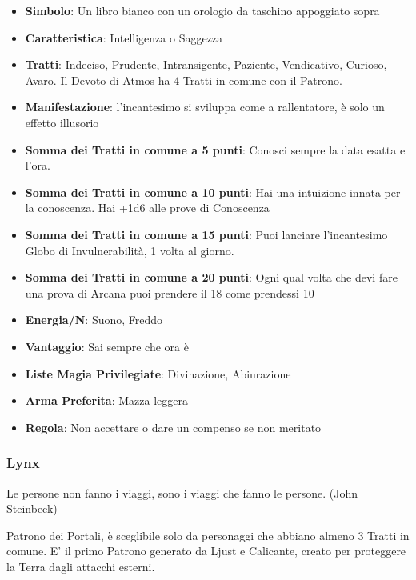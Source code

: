 \begin{multicols}{2}
\begin{itemize}[leftmargin=*] \setlength{\itemsep}{0pt}
\item \textbf{Simbolo}: Un libro bianco con un orologio da taschino appoggiato sopra
\item \textbf{Caratteristica}: Intelligenza o Saggezza
\item \textbf{Tratti}: Indeciso, Prudente, Intransigente, Paziente, Vendicativo, Curioso, Avaro. Il Devoto di Atmos ha 4 Tratti in comune con il Patrono.
\item \textbf{Manifestazione}: l'incantesimo si sviluppa come a rallentatore, è solo un effetto illusorio
\item \textbf{Somma dei Tratti in comune a 5 punti}: Conosci sempre la data esatta e l'ora.
\item \textbf{Somma dei Tratti in comune a 10 punti}: Hai una intuizione innata per la conoscenza. Hai +1d6 alle prove di Conoscenza
\item \textbf{Somma dei Tratti in comune a 15 punti}: Puoi lanciare l'incantesimo Globo di Invulnerabilità, 1 volta al giorno.
\item \textbf{Somma dei Tratti in comune a 20 punti}: Ogni qual volta che devi fare una prova di Arcana puoi prendere il 18 come prendessi 10
\item \textbf{Energia/N}: Suono, Freddo
\item \textbf{Vantaggio}: Sai sempre che ora è
\item \textbf{Liste Magia Privilegiate}: Divinazione, Abiurazione
\item \textbf{Arma Preferita}: Mazza leggera
\item \textbf{Regola}: Non accettare o dare un compenso se non meritato
\end{itemize}

\subsubsection{Lynx}\label{lynx}\hypertarget{lynx}{}

\begin{changemargin}{0.3cm}{0.3cm}\begin{enfasi}{
Le persone non fanno i viaggi, sono i viaggi che fanno le persone. (John Steinbeck)}
\end{enfasi}\end{changemargin}\medskip

Patrono dei Portali, è sceglibile solo da personaggi che abbiano almeno 3 Tratti in comune. E' il primo Patrono generato da Ljust e Calicante, creato per proteggere la Terra dagli attacchi esterni.


\end{multicols}
